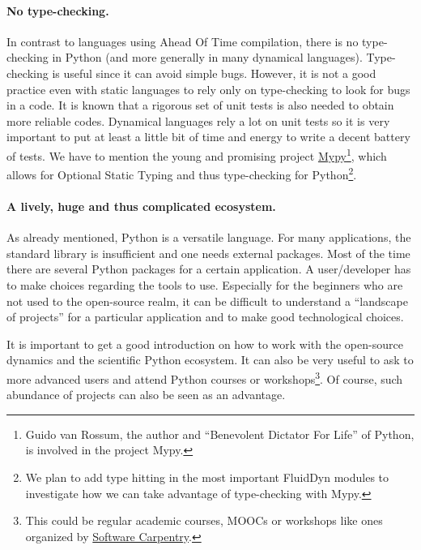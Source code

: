 \paragraph{No type-checking.} In contrast to languages using Ahead Of Time
compilation, there is no type-checking in Python (and more generally in many
dynamical languages).  Type-checking is useful since it can avoid simple bugs.
However, it is not a good practice even with static languages to rely only on
type-checking to look for bugs in a code.
%
It is known that a rigorous set of unit tests is also needed to obtain more
reliable codes.
%
Dynamical languages rely a lot on unit tests so it is very important to put at
least a little bit of time and energy to write a decent battery of tests.
%
We have to mention the young and promising project
\href{http://mypy-lang.org/}{Mypy}\footnote{Guido van Rossum, the author and
``Benevolent Dictator For Life'' of Python, is involved in the project Mypy.},
which allows for Optional Static Typing and thus type-checking for
Python\footnote{We plan to add type hitting in the most important FluidDyn modules
to investigate how we can take advantage of type-checking with Mypy.}.

\paragraph{A lively, huge and thus complicated ecosystem.} As already
mentioned, Python is a versatile language. For many applications, the standard
library is insufficient and one needs external packages.
%
Most of the time there are several Python packages for a certain application.
A user/developer has to make choices regarding the tools to use.  Especially
for the beginners who are not used to the open-source realm, it can be
difficult to understand a ``landscape of projects'' for a particular
application and to make good technological choices.

It is important to get a good introduction on how to work with the open-source
dynamics and the scientific Python ecosystem.  It can also be very useful to ask
to more advanced users and attend Python courses or workshops\footnote{This could
be regular academic courses, MOOCs or workshops like ones organized by
\href{https://software-carpentry.org/}{Software Carpentry}.}.
%
Of course, such abundance of projects can also be seen as an advantage.

